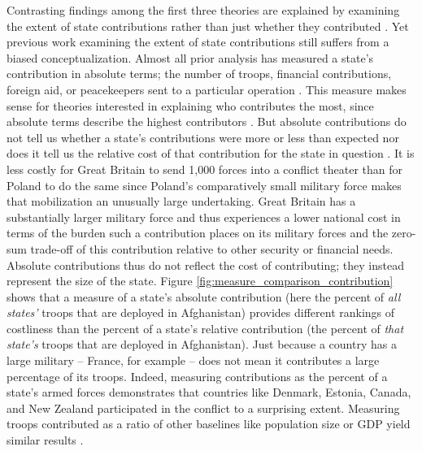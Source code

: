 \documentclass[12pt,letterpaper]{article}
\begin{document}
		Contrasting findings among the first three theories are explained by examining the extent of state contributions rather than just whether they contributed \citep[4]{cranmer_coalitionqualitymultinational_2018}. Yet previous work examining the extent of state contributions still suffers from a biased conceptualization. Almost all prior analysis has measured a state's contribution in absolute terms; the number of troops, financial contributions, foreign aid, or peacekeepers sent to a particular operation \citep{mello_democraticparticipationarmed_2014, haesebrouck_explainingmemberstates_2016}. This measure makes sense for theories interested in explaining who contributes the most, since absolute terms describe the highest contributors \citep[40-41]{bogers_missionafghanistanwho_2013}. But absolute contributions do not tell us whether a state's contributions were more or less than expected nor does it tell us the relative cost of that contribution for the state in question \citep{kreps_eliteconsensusdeterminant_2010}. It is less costly for Great Britain to send 1,000 forces into a conflict theater than for Poland to do the same since Poland's comparatively small military force makes that mobilization an unusually large undertaking. Great Britain has a substantially larger military force and thus experiences a lower national cost in terms of the burden such a contribution places on its military forces and the zero-sum trade-off of this contribution relative to other security or financial needs. Absolute contributions thus do not reflect the cost of contributing; they instead represent the size of the state. Figure \ref{fig:measure_comparison_contribution} shows that a measure of a state's absolute contribution (here the percent of \emph{all states'} troops that are deployed in Afghanistan) provides different rankings of costliness than the percent of a state's relative contribution (the percent of \textit{that state's} troops that are deployed in Afghanistan). Just because a country has a large military -- France, for example -- does not mean it contributes a large percentage of its troops. Indeed, measuring contributions as the percent of a state's armed forces demonstrates that countries like Denmark, Estonia, Canada, and New Zealand participated in the conflict to a surprising extent. Measuring troops contributed as a ratio of other baselines like population size or GDP yield similar results \citep[41]{bogers_missionafghanistanwho_2013}.
\end{document}
